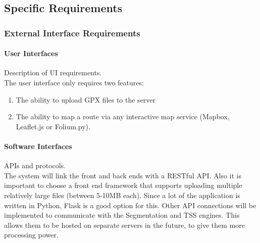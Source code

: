 \documentclass[11pt,a4paper]{report}
\begin{document}
\subsection{Specific Requirements}
\subsubsection{External Interface Requirements}
\paragraph{User Interfaces} Description of UI requirements.\\
The user interface only requires two features:
\begin{enumerate}
	\item The ability to upload GPX files to the server
	\item The ability to map a route via any interactive map service (Mapbox, Leaflet.js or Folium.py).
\end{enumerate}
\paragraph{Software Interfaces} APIs and protocols.\\
The system will link the front and back ends with a RESTful API. Also it is important to choose a front end framework
that supports uploading multiple relatively large files (between 5-10MB each). Since a lot of the application is written in Python,
Flask is a good option for this.
Other API connections will be implemented to communicate with the Segmentation and TSS engines. This allows them to be hosted on separate servers
in the future, to give them more processing power.
\end{document}
